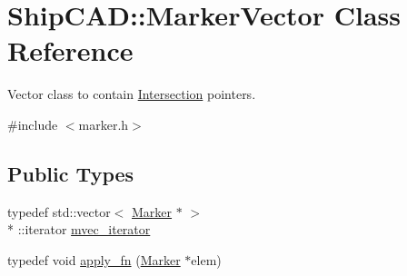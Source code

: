 \hypertarget{classShipCAD_1_1MarkerVector}{\section{Ship\-C\-A\-D\-:\-:Marker\-Vector Class Reference}
\label{classShipCAD_1_1MarkerVector}
}


Vector class to contain \hyperlink{classShipCAD_1_1Intersection}{Intersection} pointers.  




{\ttfamily \#include $<$marker.\-h$>$}

\subsection*{Public Types}
\begin{DoxyCompactItemize}
\item 
typedef std\-::vector$<$ \hyperlink{classShipCAD_1_1Marker}{Marker} $\ast$ $>$\\*
\-::iterator \hyperlink{classShipCAD_1_1MarkerVector_a15ac0550091a081f0ef20c3f0b03693b}{mvec\-\_\-iterator}
\item 
typedef void \hyperlink{classShipCAD_1_1MarkerVector_a9b5bd2154a62bceb3e4a0bb648fb297b}{apply\-\_\-fn} (\hyperlink{classShipCAD_1_1Marker}{Marker} $\ast$elem)
\end{DoxyCompactItemize}

